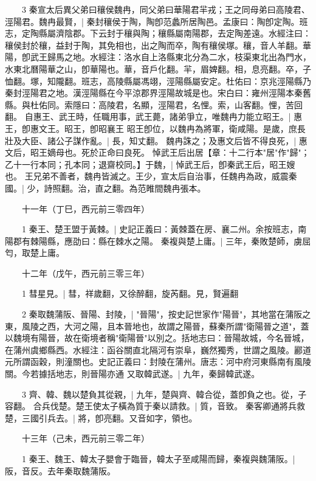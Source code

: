 　　3 秦宣太后異父弟曰穰侯魏冉，同父弟曰華陽君羋戎；王之同母弟曰高陵君、涇陽君。魏冉最賢，|{
	秦封穰侯于陶，陶卽范蠡所居陶邑。孟康曰：陶卽定陶。班志，定陶縣屬濟陰郡。下云封于穰與陶；穰縣屬南陽郡，去定陶差遠。水經注曰：穰侯封於穰，益封于陶，其免相也，出之陶而卒，陶有穰侯塚。穰，音人羊翻。華陽，卽武王歸馬之地。水經注：洛水自上洛縣東北分為二水，枝渠東北出為門水，水東北曆陽華之山，卽華陽也。華，音戶化翻。羋，眉婢翻。相，息亮翻。卒，子恤翻。塚，知隴翻。班志，高陵縣屬馮翊，涇陽縣屬安定。杜佑曰：京兆涇陽縣乃秦封涇陽君之地。漢涇陽縣在今平涼郡界涇陽故城是也。宋白曰：雍州涇陽本秦舊縣。與杜佑同。索隱曰：高陵君，名顯，涇陽君，名悝。索，山客翻。悝，苦回翻。
	}
自惠王、武王時，任職用事，武王薨，諸弟爭立，唯魏冉力能立昭王。|{
	惠王，卽惠文王。昭王，卽昭襄王
	}
昭王卽位，以魏冉為將軍，衛咸陽。是歲，庶長壯及大臣、諸公子謀作亂。|{
	長，知丈翻。
	}
魏冉誅之；及惠文后皆不得良死，|{
	惠文后，昭王嫡母也。死於正命曰良死。
	}
悼武王后出居【章：十二行本"居"作"歸"；乙十一行本同；孔本同；退齋校同。】于魏，|{
	悼武王后，卽秦武王后，昭王嫂也。
	}
王兄弟不善者，魏冉皆滅之。王少，宣太后自治事，任魏冉為政，威震秦國。|{
	少，詩照翻。治，直之翻。為范睢間魏冉張本。
	}

　　十一年（丁巳，西元前三零四年）

　　1 秦王、楚王盟于黃棘。|{
	史記正義曰：黃棘蓋在房、襄二州。余按班志，南陽郡有棘陽縣，應劭曰：縣在棘水之陽。
	}
秦複與楚上庸。|{
	三年，秦敗楚師，虜屈匄，取楚上庸。
	}

　　十二年（戊午，西元前三零三年）

　　1 彗星見。|{
	彗，祥歲翻，又徐醉翻，旋芮翻。見，賢遍翻
	}

　　2 秦取魏蒲阪、晉陽、封陵，|{
	"晉陽"，按史記世家作"陽晉"，其地當在蒲阪之東，風陵之西，大河之陽，且本晉地也，故謂之陽晉，蘇秦所謂"衛陽晉之道"，蓋以魏境有陽晉，故在衛境者稱"衛陽晉"以別之。括地志曰：晉陽故城，今名晉城，在蒲州虞鄉縣西。水經注：函谷關直北隔河有崇阜，巍然獨秀，世謂之風陵。酈道元所謂函穀，則潼關也。史記正義曰：封陵在蒲州。唐志：河中府河東縣南有風陵關。今若據括地志，則晉陽亦通
	}
又取韓武遂。|{
	九年，秦歸韓武遂。
	}

　　3 齊、韓、魏以楚負其從親，|{
	九年，楚與齊、韓合從，蓋卽負之也。從，子容翻。
	}
合兵伐楚。楚王使太子橫為質于秦以請救。|{
	質，音致。
	}
秦客卿通將兵救楚，三國引兵去。|{
	將，卽亮翻。又音如字，領也。
	}

　　十三年（己未，西元前三零二年）

　　1 秦王、魏王、韓太子嬰會于臨晉，韓太子至咸陽而歸，秦複與魏蒲阪。|{
	阪，音反。去年秦取魏蒲阪。
	}

